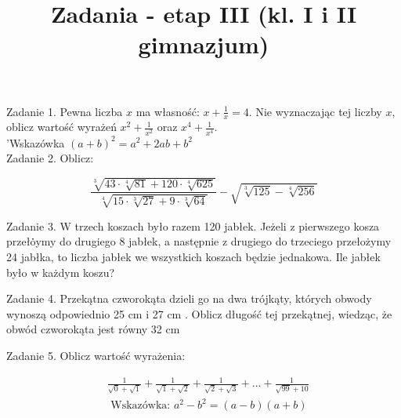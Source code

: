 \documentclass[10pt]{article}
\title{Zadania - etap III (kl. I i II gimnazjum) }
\author{}
\date{}
\begin{document}
\maketitle
Zadanie 1. Pewna liczba \(x\) ma własność: \(x+\frac{1}{x}=4\). Nie wyznaczając tej liczby \(x\), oblicz wartość wyrażeń \(x^{2}+\frac{1}{x^{2}}\) oraz \(x^{4}+\frac{1}{x^{4}}\).\\
'Wskazówka \((a+b)^{2}=a^{2}+2 a b+b^{2}\)\\
Zadanie 2. Oblicz:

\[
\frac{\sqrt[3]{43 \cdot \sqrt[4]{81}+120 \cdot \sqrt[4]{625}}}{\sqrt[4]{15 \cdot \sqrt[3]{27}+9 \cdot \sqrt[3]{64}}}-\sqrt{\sqrt[3]{125}-\sqrt[4]{256}}
\]

Zadanie 3. W trzech koszach było razem 120 jabłek. Jeżeli z pierwszego kosza przełȯ̇ymy do drugiego 8 jabłek, a następnie z drugiego do trzeciego przełożymy 24 jabłka, to liczba jabłek we wszystkich koszach będzie jednakowa. Ile jabłek było w każdym koszu?

Zadanie 4. Przekątna czworokąta dzieli go na dwa trójkąty, których obwody wynoszą odpowiednio 25 cm i 27 cm . Oblicz długość tej przekątnej, wiedząc, że obwód czworokąta jest równy 32 cm

Zadanie 5. Oblicz wartość wyrażenia:

\[
\begin{aligned}
& \frac{1}{\sqrt{0}+\sqrt{1}}+\frac{1}{\sqrt{1}+\sqrt{2}}+\frac{1}{\sqrt{2}+\sqrt{3}}+\ldots+\frac{1}{\sqrt{99}+10} \\
& \text { Wskazówka: } a^{2}-b^{2}=(a-b)(a+b)
\end{aligned}
\]
\end{document}

